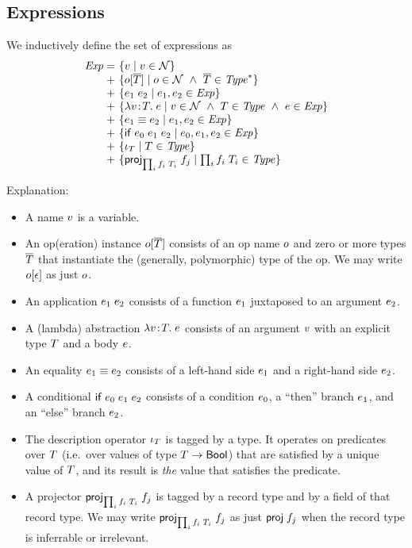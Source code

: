 \subsection{Expressions}

We inductively define the set of expressions as
\[
\setdefVIIIoI
 {\Expr}
 {+}
 {\setST{\var}{\var\in\Nam}}
 {\setST{\opO}{\onam\in\Nam\AND\typS\in\Seq{\Typ}}}
 {\setST{\appO}{\expr_1,\expr_2\in\Expr}}
 {\setST{\absO}{\var\in\Nam\AND\typ\in\Typ\AND\expr\in\Expr}}
 {\setST{\eqO}{\expr_1,\expr_2\in\Expr}}
 {\setST{\iifO}{\expr_0,\expr_1,\expr_2\in\Expr}}
 {\setST{\descopO}{\typ\in\Typ}}
\setdefVIIIoII
 {+}
 {\setST{\projopO}{\trecO\in\Typ}}
\]

Explanation:
\begin{itemize}
\item
A name $v$ is a variable.
\item
An op(eration) instance $o[\overline{T}]$ consists of an op name $o$ and zero or more
types $\overline{T}$ that instantiate the (generally, polymorphic) type of the op. We
may write $o[\epsilon]$ as just $o$.
\item
An application $e_1\;e_2$ consists of a function $e_1$ juxtaposed to an
argument $e_2$.
\item
A (lambda) abstraction $\lambda v\!:\!T.\;e$ consists of an argument $v$ with an explicit
type $T$ and a body $e$.


\item
An equality $e_1\equiv e_2$ consists of a left-hand side $e_1$ and a right-hand
side $e_2$.
\item
A conditional $\mathsf{if}\;e_0\;e_1\;e_2$ consists of a condition $e_0$, a ``then'' branch
$e_1$, and an ``else'' branch $e_2$.
\item
The description operator $\iota_{T}$ is tagged by a type. It operates on
predicates over $T$ (i.e.\ over values of type $T\to\mathsf{Bool}$) that
are satisfied by a unique value of $T$, and its result is \emph{the} value
that satisfies the predicate.
\item
A projector $\mathsf{proj}_{\prod_{i}f_i\;T_i}\;{f_j}$ is tagged by a record type and by a field of that
record type. We may write $\mathsf{proj}_{\prod_{i}f_i\;T_i}\;{f_j}$ as just $\mathsf{proj}\;{f_j}$ when the record type is
inferrable or irrelevant.
\end{itemize}

